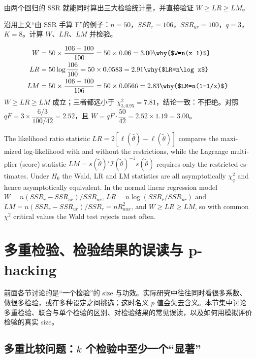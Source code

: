 由两个回归的 SSR 就能同时算出三大检验统计量，并直接验证 $W\ge LR\ge LM$。

\begin{exmp}[三大检验的数值比较]\label{ex:U06b-trinity}
沿用上文“由 SSR 手算 F”的例子：$n=50$，$SSR_r=106$，$SSR_{ur}=100$，$q=3$，$K=8$。计算 $W$、$LR$、$LM$ 并检验。

\solution
\begin{align*}
W&=50\times\frac{106-100}{100}=50\times0.06=3.00 \why{$W=n(x-1)$}\\
LR&=50\log\frac{106}{100}=50\times0.0583=2.91 \why{$LR=n\log x$}\\
LM&=50\times\frac{106-100}{106}=50\times0.0566=2.83 \why{$LM=n(1-1/x)$}
\end{align*}
$W\ge LR\ge LM$ 成立；三者都远小于 $\chi^2_{3,0.95}=7.81$，结论一致：不拒绝。对照 $qF=3\times\dfrac{6/3}{100/42}=2.52$，且 $W=qF\cdot\dfrac{50}{42}=2.52\times1.19=3.00$。
\end{exmp}

\begin{english}
The likelihood ratio statistic $LR=2[\ell(\hat\theta)-\ell(\tilde\theta)]$ compares the maximized log-likelihood with and without the restrictions, while the Lagrange multiplier (score) statistic $LM=s(\tilde\theta)'\mathcal I(\tilde\theta)^{-1}s(\tilde\theta)$ requires only the restricted estimates. Under $H_0$ the Wald, LR and LM statistics are all asymptotically $\chi^2_q$ and hence asymptotically equivalent. In the normal linear regression model $W=n(SSR_r-SSR_{ur})/SSR_{ur}$, $LR=n\log(SSR_r/SSR_{ur})$ and $LM=n(SSR_r-SSR_{ur})/SSR_r=nR^2_{aux}$, and $W\ge LR\ge LM$, so with common $\chi^2$ critical values the Wald test rejects most often.
\end{english}

\section{多重检验、检验结果的误读与 p-hacking}\label{sec:U06b-multiple}

前面各节讨论的是“一个检验”的 size 与功效。实际研究中往往同时看很多系数、做很多检验，或在多种设定之间挑选；这时名义 $p$ 值会失去含义。本节集中讨论多重检验、联合与单个检验的区别、对检验结果的常见误读，以及如何用模拟评价检验的真实 size。

\subsection{多重比较问题：\texorpdfstring{$k$}{k} 个检验中至少一个“显著”}

